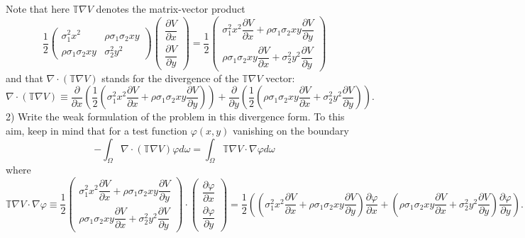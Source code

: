 \documentclass{article}
\begin{document}
Note that here $\mathbb{T} \nabla V$ denotes the matrix-vector product
\[ \dfrac{1}{2} \left(\begin{array}{cc}
     \sigma_1^2 x^2 & \rho \sigma_1 \sigma_2 x y\\
     \rho \sigma_1 \sigma_2 x y & \sigma^2_2 y^2
   \end{array}\right) \left( \begin{array}{c}
     \dfrac{\partial V}{\partial x}\\
     \dfrac{\partial V}{\partial y}
   \end{array} \right) = \dfrac{1}{2} \left( \begin{array}{c}
     \sigma^2_1 x^2 \dfrac{\partial V}{\partial x} + \rho \sigma_1 \sigma_2 x
     y \dfrac{\partial V}{\partial y}\\
     \rho \sigma_1 \sigma_2 x y \dfrac{\partial V}{\partial x} + \sigma^2_2
     y^2 \dfrac{\partial V}{\partial y}
   \end{array} \right) \]
and that $\nabla \cdot (\mathbb{T} \nabla V)$ stands for the divergence of the
$\mathbb{T} \nabla V$ vector:
\[ \nabla \cdot (\mathbb{T} \nabla V) \equiv \dfrac{\partial}{\partial x}
   \left( \dfrac{1}{2} \left( \sigma^2_1 x^2 \dfrac{\partial V}{\partial x} +
   \rho \sigma_1 \sigma_2 x y \dfrac{\partial V}{\partial y} \right) \right) +
   \dfrac{\partial}{\partial y} \left( \dfrac{1}{2} \left( \rho \sigma_1
   \sigma_2 x y \dfrac{\partial V}{\partial x} + \sigma^2_2 y^2
   \dfrac{\partial V}{\partial y} \right) \right) . \]
2) Write the weak formulation of the problem in this divergence form. To this
aim, keep in mind that for a test function $\varphi (x, y)$ vanishing on the
boundary
\[ - \int_{\Omega} \nabla \cdot (\mathbb{T} \nabla V) \varphi d \omega =
   \int_{\Omega} \mathbb{T} \nabla V \cdot \nabla \varphi d \omega \]
where
\[ \mathbb{T} \nabla V \cdot \nabla \varphi \equiv \dfrac{1}{2} \left(
   \begin{array}{c}
     \sigma^2_1 x^2 \dfrac{\partial V}{\partial x} + \rho \sigma_1 \sigma_2 x
     y \dfrac{\partial V}{\partial y}\\
     \rho \sigma_1 \sigma_2 x y \dfrac{\partial V}{\partial x} + \sigma^2_2
     y^2 \dfrac{\partial V}{\partial y}
   \end{array} \right) \cdot \left( \begin{array}{c}
     \dfrac{\partial \varphi}{\partial x}\\
     \dfrac{\partial \varphi}{\partial y}
   \end{array} \right) = \dfrac{1}{2} \left( \left( \sigma^2_1 x^2
   \dfrac{\partial V}{\partial x} + \rho \sigma_1 \sigma_2 x y \dfrac{\partial
   V}{\partial y} \right) \dfrac{\partial \varphi}{\partial x} + \left( \rho
   \sigma_1 \sigma_2 x y \dfrac{\partial V}{\partial x} + \sigma^2_2 y^2
   \dfrac{\partial V}{\partial y} \right) \dfrac{\partial \varphi}{\partial y}
   \right) . \]
\end{document}
